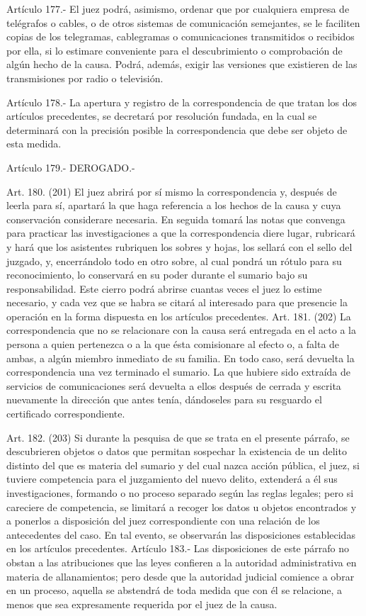     Artículo 177.- El juez podrá, asimismo, ordenar que por cualquiera empresa de telégrafos o cables, o de otros sistemas de comunicación semejantes, se le faciliten copias de los telegramas, cablegramas o comunicaciones transmitidos o recibidos por ella, si lo estimare conveniente para el descubrimiento o comprobación de algún hecho de la causa. Podrá, además, exigir las versiones que existieren de las transmisiones por radio o televisión.

    Artículo 178.- La apertura y registro de la correspondencia de que tratan los dos artículos precedentes, se decretará por resolución fundada, en la cual se determinará con la precisión posible la correspondencia que debe ser objeto de esta medida.

    Artículo 179.- DEROGADO.-


    Art. 180. (201) El juez abrirá por sí mismo la correspondencia y, después de leerla para sí, apartará la que haga referencia a los hechos de la causa y cuya conservación considerare necesaria.
    En seguida tomará las notas que convenga para practicar las investigaciones a que la correspondencia diere lugar, rubricará y hará que los asistentes rubriquen los sobres y hojas, los sellará con el sello del juzgado, y, encerrándolo todo en otro sobre, al cual pondrá un rótulo para su reconocimiento, lo conservará en su poder durante el sumario bajo su responsabilidad.
    Este cierro podrá abrirse cuantas veces el juez lo estime necesario, y cada vez que se habra se citará al interesado para que presencie la operación en la forma dispuesta en los artículos precedentes.
    Art. 181. (202) La correspondencia que no se relacionare con la causa será entregada en el acto a la persona a quien pertenezca o a la que ésta comisionare al efecto o, a falta de ambas, a algún miembro inmediato de su familia.
    En todo caso, será devuelta la correspondencia una vez terminado el sumario.
    La que hubiere sido extraída de servicios de comunicaciones será devuelta a ellos después de cerrada y escrita nuevamente la dirección que antes tenía, dándoseles para su resguardo el certificado correspondiente.

    Art. 182. (203) Si durante la pesquisa de que se trata en el presente párrafo, se descubrieren objetos o datos que permitan sospechar la existencia de un delito distinto del que es materia del sumario y del cual nazca acción pública, el juez, si tuviere competencia para el juzgamiento del nuevo delito, extenderá a él sus investigaciones, formando o no proceso separado según las reglas legales; pero si careciere de competencia, se limitará a recoger los datos u objetos encontrados y a ponerlos a disposición del juez correspondiente con una relación de los antecedentes del caso.
    En tal evento, se observarán las disposiciones establecidas en los artículos precedentes.
    Artículo 183.- Las disposiciones de este párrafo no obstan a las atribuciones que las leyes confieren a la autoridad administrativa en materia de allanamientos; pero desde que la autoridad judicial comience a obrar en un proceso, aquella se abstendrá de toda medida que con él se relacione, a menos que sea expresamente requerida por el juez de la causa.

